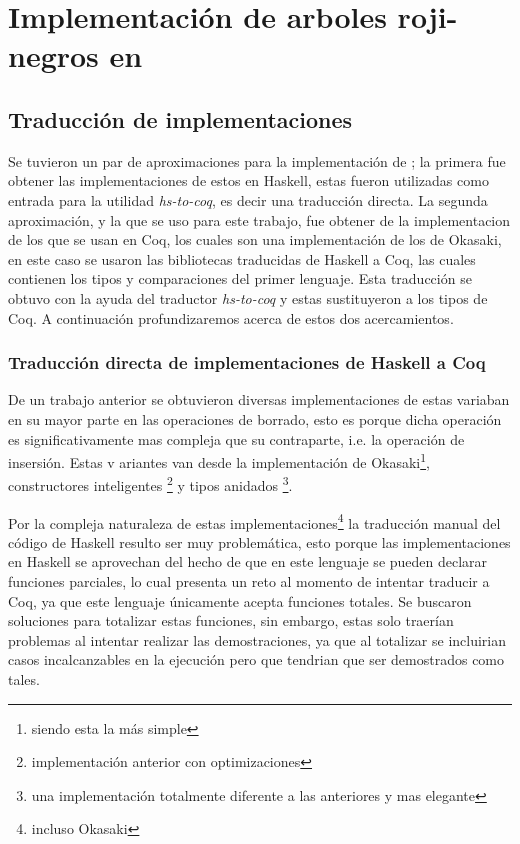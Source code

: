 \chapter{Implementación de arboles roji-negros en {\coq}}

\section{Traducción de implementaciones}
Se tuvieron un par de aproximaciones para la implementación de {\arns}; la primera fue obtener las
implementaciones de estos \cite{tesisG} en Haskell, estas fueron utilizadas como entrada para la
utilidad \textit{hs-to-coq}, es decir una traducci\'on directa. La segunda aproximación, y la que
se uso para este trabajo, fue obtener de \cite{MSetRBT} la implementacion de los {\arns} que se
usan en Coq, los cuales son una implementaci\'on de los {\arns} de Okasaki, en este caso se usaron
las bibliotecas traducidas de Haskell a Coq, las cuales contienen los tipos y comparaciones del
primer lenguaje. Esta traducción se obtuvo con la ayuda del traductor \textit{hs-to-coq} y estas
sustituyeron a los tipos de Coq. A continuación profundizaremos acerca de estos dos acercamientos.

\subsection{Traducción directa de implementaciones de Haskell a Coq}
De un trabajo anterior\cite{tesisG} se obtuvieron diversas implementaciones de {\arns} estas
variaban en su mayor parte en las operaciones de borrado, esto es porque dicha operación es
significativamente mas compleja que su contraparte, i.e. la operación de insersi\'on. Estas v
ariantes van desde la implementación de Okasaki\footnote{siendo esta la m\'as simple},
constructores inteligentes \footnote{implementaci\'on anterior con optimizaciones} y tipos anidados
\footnote{una implementaci\'on totalmente diferente a las anteriores y mas elegante}.

Por la compleja naturaleza de estas implementaciones\footnote{incluso Okasaki} la traducción
manual del código de Haskell resulto ser muy problemática, esto porque las implementaciones en
Haskell se aprovechan del hecho de que en este lenguaje se pueden declarar funciones parciales, lo
cual presenta un reto al momento de intentar traducir a Coq, ya que este lenguaje únicamente acepta
funciones totales. Se buscaron soluciones para totalizar estas funciones, sin embargo, estas solo
traerían problemas al intentar realizar las demostraciones, ya que al totalizar se incluirian casos
incalcanzables en la ejecuci\'on pero que tendrian que ser demostrados como tales.

